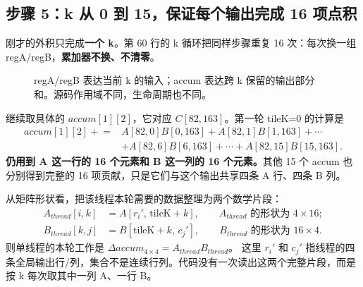 \subsection{步骤 5：k 从 0 到 15，保证每个输出完成 16 项点积}
刚才的外积只完成\textbf{一个 k}。第 60 行的 k 循环把同样步骤重复 16 次：每次换一组 regA/regB，\textbf{累加器不换、不清零}。
\begin{figure}[H]\centering
{}
\caption{regA/regB 表达当前 k 的输入；accum 表达跨 k 保留的输出部分和。源码作用域不同，生命周期也不同。}
\end{figure}

继续取具体的 $accum[1][2]$，它对应 $C[82,163]$。第一轮 tileK=0 的计算是
\begin{align*}
accum[1][2]\mathrel{+}={}&A[82,0]B[0,163]+A[82,1]B[1,163]+\cdots\\
&+A[82,6]B[6,163]+\cdots+A[82,15]B[15,163].
\end{align*}
\textbf{仍用到 A 这一行的 16 个元素和 B 这一列的 16 个元素。}其他 15 个 accum 也分别得到完整的 16 项贡献，只是它们与这个输出共享四条 A 行、四条 B 列。

从矩阵形状看，把该线程本轮需要的数据整理为两个数学片段：
\begin{align*}
A_{thread}[i,k]&=A[r_i',\,\mathrm{tileK}+k],\qquad A_{thread}\text{ 的形状为 }4\times16;\\
B_{thread}[k,j]&=B[\mathrm{tileK}+k,\,c_j'],\qquad B_{thread}\text{ 的形状为 }16\times4.
\end{align*}
则单线程的本轮工作是 $\Delta accum_{4\times4}=A_{thread}B_{thread}$。
这里 $r_i'$ 和 $c_j'$ 指线程的四条全局输出行/列，集合不是连续行列。代码没有一次读出这两个完整片段，而是按 k 每次取其中一列 A、一行 B。

